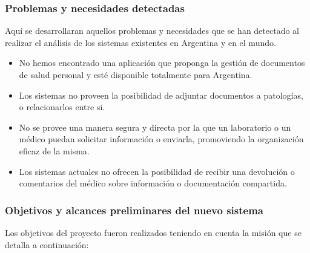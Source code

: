 \subsubsection{Problemas y necesidades detectadas}
Aquí se desarrollaran aquellos problemas y necesidades que se han detectado al realizar el análisis de los sistemas existentes en Argentina y en el mundo.
	\begin{itemize}

     \item No hemos encontrado una aplicación que proponga la gestión de documentos de salud personal y esté disponible totalmente para Argentina.
     
     \item Los sistemas no proveen la posibilidad de adjuntar documentos a patologías, o relacionarlos entre si.
     
     \item No se provee una manera segura y directa por la que un laboratorio o un médico puedan solicitar información o enviarla, promoviendo la organización eficaz de la misma. 
     
     \item Los sistemas actuales no ofrecen la posibilidad de recibir una devolución o comentarios del médico sobre información o documentación compartida.


     


\end{itemize}

\clearpage
\subsubsection{Objetivos y alcances preliminares del nuevo sistema}

Los objetivos del proyecto fueron realizados teniendo en cuenta la misión que se detalla a continuación:


